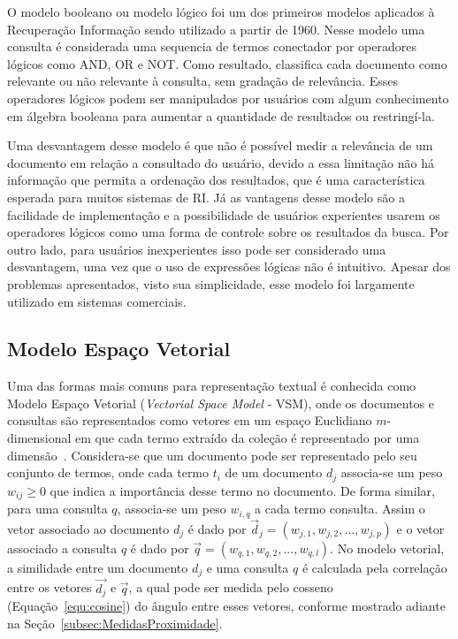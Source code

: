 O modelo booleano ou modelo lógico foi um dos primeiros modelos aplicados à Recuperação Informação sendo utilizado a partir de 1960. Nesse modelo uma consulta é considerada uma sequencia de termos conectador por operadores lógicos como AND, OR e NOT. Como resultado, classifica cada documento como relevante ou não relevante à consulta, sem gradação de relevância. Esses operadores lógicos podem ser manipulados por usuários com algum conhecimento em álgebra booleana para aumentar a quantidade de resultados ou restringí-la.

Uma desvantagem desse modelo é que não é possível medir a relevância de um documento em relação a consultado do usuário, devido a essa limitação não há informação que permita a ordenação dos resultados, que é uma característica esperada para muitos sistemas de RI.
Já as vantagens desse modelo são a facilidade de implementação e a possibilidade de usuários experientes usarem os operadores lógicos como uma forma de controle sobre os resultados da busca. Por outro lado, para usuários inexperientes isso pode ser considerado uma desvantagem, uma vez que o uso de expressões lógicas não é intuitivo. Apesar dos problemas apresentados, visto sua simplicidade, esse modelo foi largamente utilizado em sistemas comerciais. 



\subsection{Modelo Espaço Vetorial}
\label{subsec:modeloespacovetorial}

Uma das formas mais comuns para representação textual é conhecida como Modelo Espaço Vetorial (\textit{Vectorial Space Model} - VSM), onde os documentos e consultas são representados como vetores em um espaço Euclidiano $m$-dimensional em que cada termo extraído da coleção é representado por uma dimensão~\cite{Rezende2003}. 
% 
Considera-se que um documento pode ser representado pelo seu conjunto de termos, onde cada termo $t_i$ de um documento $d_j$ associa-se um peso $w_{ij}\geq0$ que indica a importância desse termo no documento. 
%
De forma similar, para uma consulta $q$, associa-se um peso $w_{i,q}$ a cada termo consulta. 
%
Assim o vetor associado ao documento $d_j$ é dado por $\vec{d}_{j} = (w_{j,1}, w_{j,2}, ..., w_{j,p})$ 
%
e o vetor associado a consulta $q$ é dado por $\vec{q} = (w_{q,1}, w_{q,2}, ..., w_{q,l})$.
%
No modelo vetorial, a similidade entre um documento $d_j$ e uma consulta $q$ é calculada pela correlação entre os vetores $\vec{d_j}$ e $\vec{q}$, a qual pode ser medida pelo cosseno (Equação~\ref{equ:cosine}) do ângulo entre esses vetores, conforme mostrado adiante na Seção~\ref{subsec:MedidasProximidade}. 



